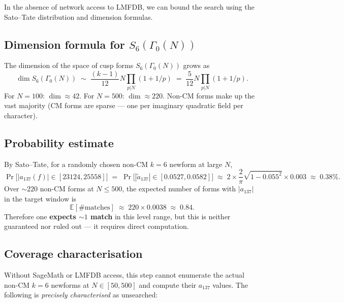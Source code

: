 \documentclass[12pt,a4paper]{article}
\theoremstyle{definition}
\theoremstyle{remark}
\begin{document}
In the absence of network access to LMFDB, we can bound the search using
the Sato--Tate distribution and dimension formulas.

\subsection{Dimension formula for $S_6(\Gamma_0(N))$}

The dimension of the space of cusp forms $S_6(\Gamma_0(N))$ grows as
\begin{equation}
  \dim S_6(\Gamma_0(N)) \;\sim\; \frac{(k-1)}{12} N \prod_{p|N}(1+1/p)
  \;=\; \frac{5}{12} N \prod_{p|N}(1+1/p).
  \label{eq:dimension}
\end{equation}
For $N=100$: $\dim \approx 42$.  For $N=500$: $\dim \approx 220$.
Non-CM forms make up the vast majority (CM forms are sparse --- one per
imaginary quadratic field per character).

\subsection{Probability estimate}

By Sato--Tate, for a randomly chosen non-CM $k=6$ newform at large $N$,
\begin{equation}
  \Pr\!\bigl[|a_{137}(f)| \in [23124, 25558]\bigr]
  \;=\; \Pr\!\bigl[|\tilde a_{137}| \in [0.0527, 0.0582]\bigr]
  \;\approx\; 2 \times \frac{2}{\pi}\sqrt{1-0.055^2}\times 0.003
  \;\approx\; 0.38\%.
  \label{eq:prob}
\end{equation}
Over $\sim 220$ non-CM forms at $N \le 500$, the expected number of forms
with $|a_{137}|$ in the target window is
\begin{equation}
  \mathbb{E}[\#\text{matches}] \;\approx\; 220 \times 0.0038 \;\approx\; 0.84.
  \label{eq:expected}
\end{equation}
Therefore one \textbf{expects $\sim 1$ match} in this level range, but this
is neither guaranteed nor ruled out --- it requires direct computation.

\subsection{Coverage characterisation}

Without SageMath or LMFDB access, this step cannot enumerate the
actual non-CM $k=6$ newforms at $N \in [50,500]$ and compute their
$a_{137}$ values.  The following is \emph{precisely characterised}
as unsearched:
\end{document}
